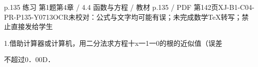 \begin{bankitem}{p.135 练习 第1题}{第4章 / 4.4 函数与方程 / 教材 p.135 / PDF 第142页}{XJ-B1-C04-PR-P135-Y0713}{OCR未校对：公式与文字均可能有误；未完成数学TeX转写；禁止直接发给学生}
\begin{ocrdraft}
\par
1.借助计算器或计算机，用二分法求方程十x一1一0的根的近似值（误差
\par
不超过0．00D．
\end{ocrdraft}
\end{bankitem}
